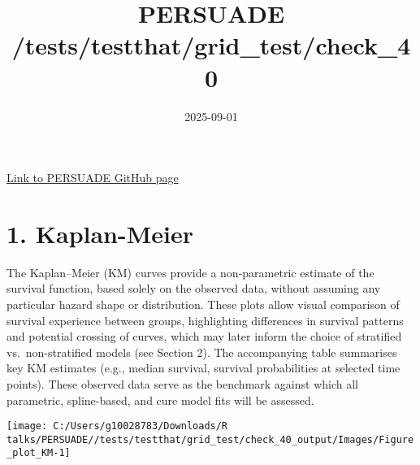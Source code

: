 \documentclass[
]{article}
\title{PERSUADE /tests/testthat/grid\_test/check\_40}
\author{}
\date{\vspace{-2.5em}2025-09-01}
\begin{document}
\maketitle

{
\hypersetup{linkcolor=}
\setcounter{tocdepth}{2}
\tableofcontents
}
\hfill\break

\href{https://github.com/Bram-R/PERSUADE}{Link to PERSUADE GitHub page}

\clearpage

\section{1. Kaplan-Meier}\label{kaplan-meier}

The Kaplan--Meier (KM) curves provide a non-parametric estimate of the
survival function, based solely on the observed data, without assuming
any particular hazard shape or distribution. These plots allow visual
comparison of survival experience between groups, highlighting
differences in survival patterns and potential crossing of curves, which
may later inform the choice of stratified vs.~non-stratified models (see
Section 2). The accompanying table summarises key KM estimates (e.g.,
median survival, survival probabilities at selected time points). These
observed data serve as the benchmark against which all parametric,
spline-based, and cure model fits will be assessed.

\clearpage

\begin{flushleft}\texttt{[image: C:/Users/g10028783/Downloads/R talks/PERSUADE//tests/testthat/grid\_test/check\_40\_output/Images/Figure\_plot\_KM-1]} \end{flushleft}

\begin{table}[H]
\centering
\caption{\label{tab:Table_1}Observed survival data}
\centering
{}
\end{table}
\end{document}
